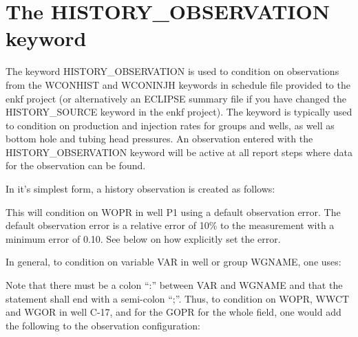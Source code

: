 \documentclass[a4paper,10pt,english]{sphinxmanual}
\begin{document}
\section{The HISTORY\_OBSERVATION keyword}
\label{\detokenize{observations/index:the-history-observation-keyword}}
The keyword HISTORY\_OBSERVATION is used to condition on observations
from the WCONHIST and WCONINJH keywords in schedule file provided to
the enkf project (or alternatively an ECLIPSE summary file if you have
changed the HISTORY\_SOURCE keyword in the enkf project). The keyword
is typically used to condition on production and injection rates for
groups and wells, as well as bottom hole and tubing head pressures. An
observation entered with the HISTORY\_OBSERVATION keyword will be
active at all report steps where data for the observation can be
found.

In it’s simplest form, a history observation is created as follows:

%
\begin{sphinxVerbatim}[commandchars=\\\{\}]
 
\end{sphinxVerbatim}

This will condition on WOPR in well P1 using a default observation
error. The default observation error is a relative error of 10\% to the
measurement with a minimum error of 0.10. See below on how explicitly
set the error.

In general, to condition on variable VAR in well or group WGNAME, one
uses:

%
\begin{sphinxVerbatim}[commandchars=\\\{\}]
 
\end{sphinxVerbatim}

Note that there must be a colon “:” between VAR and WGNAME and that
the statement shall end with a semi-colon “;”. Thus, to condition on
WOPR, WWCT and WGOR in well C-17, and for the GOPR for the whole
field, one would add the following to the observation configuration:

%
\begin{sphinxVerbatim}[commandchars=\\\{\}]
 
 
 

 
\end{sphinxVerbatim}
\end{document}
